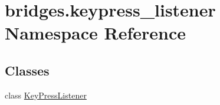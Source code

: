 \hypertarget{namespacebridges_1_1keypress__listener}{}\section{bridges.\+keypress\+\_\+listener Namespace Reference}
\label{namespacebridges_1_1keypress__listener}
\subsection*{Classes}
\begin{DoxyCompactItemize}
\item 
class \mbox{\hyperlink{classbridges_1_1keypress__listener_1_1_key_press_listener}{Key\+Press\+Listener}}
\end{DoxyCompactItemize}
